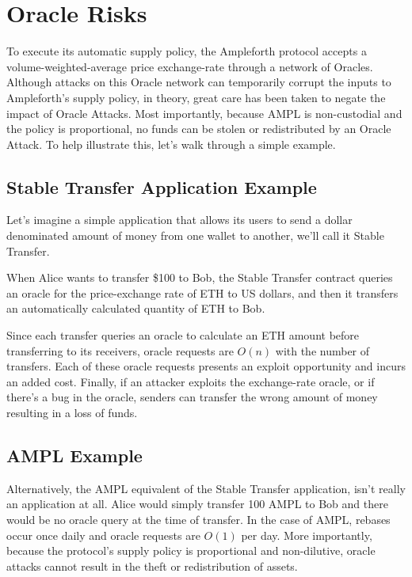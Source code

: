 \documentclass[11pt]{article}
\begin{document}
\section{Oracle Risks}

To execute its automatic supply policy, the Ampleforth protocol accepts a
volume-weighted-average price exchange-rate through a network of Oracles. Although attacks on
this Oracle network can temporarily corrupt the inputs to Ampleforth's supply policy, in
theory, great care has been taken to negate the impact of Oracle Attacks. Most importantly,
because AMPL is non-custodial and the policy is proportional, no funds can be stolen or
redistributed by an Oracle Attack. To help illustrate this, let's walk through a simple
example.

\subsection{Stable Transfer Application Example}

Let's imagine a simple application that allows its users to send a dollar denominated amount
of money from one wallet to another, we'll call it Stable Transfer.

When Alice wants to transfer \$100 to Bob, the Stable Transfer contract queries an oracle for
the price-exchange rate of ETH to US dollars, and then it transfers an automatically
calculated quantity of ETH to Bob.

Since each transfer queries an oracle to calculate an ETH amount before transferring to its
receivers, oracle requests are $O(n)$ with the number of transfers. Each of these oracle
requests presents an exploit opportunity and incurs an added cost. Finally, if an attacker
exploits the exchange-rate oracle, or if there's a bug in the oracle, senders can transfer
the wrong amount of money resulting in a loss of funds.

\subsection{AMPL Example}

Alternatively, the AMPL equivalent of the Stable Transfer application, isn't really an
application at all. Alice would simply transfer 100 AMPL to Bob and there would be no oracle
query at the time of transfer. In the case of AMPL, rebases occur once daily and oracle
requests are $O(1)$ per day. More importantly, because the protocol's supply policy is
proportional and non-dilutive, oracle attacks cannot result in the theft or redistribution of
assets.
\end{document}
